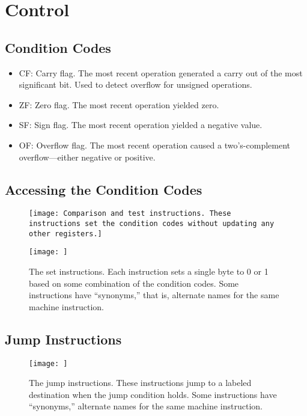 \section{Control}

\subsection{Condition Codes}
\begin{itemize}
    \item CF: Carry flag. The most recent operation generated a carry out of the most significant bit. Used to detect overflow for unsigned operations.
    \item ZF: Zero flag. The most recent operation yielded zero.
    \item SF: Sign flag. The most recent operation yielded a negative value.
    \item OF: Overflow flag. The most recent operation caused a two’s-complement overflow—either negative or positive.
\end{itemize}

\subsection{Accessing the Condition Codes}


\begin{figure}[h!]
    \centering
    \texttt{[image: Comparison and test instructions. These instructions set the condition    codes without updating any other registers.]}
    \caption{}
\end{figure}


\begin{figure}[h!]
    \centering
    \texttt{[image: ]}
    \caption{The set instructions. Each instruction sets a single byte to 0 or 1 based on some combination of the condition codes. Some instructions have “synonyms,” that is,    alternate names for the same machine instruction.}
\end{figure}

\subsection{Jump Instructions}

\begin{figure}[h!]
    \centering
    \texttt{[image: ]}
    \caption{The jump instructions. These instructions jump to a labeled destination    when the jump condition holds. Some instructions have “synonyms,” alternate names    for the same machine instruction.}
\end{figure}

